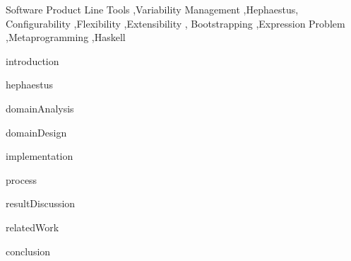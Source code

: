 \documentclass[preprint,12pt]{elsarticle}
\newcommand{\hpl}{\textsf{Hephaestus-PL}}
\newcommand{\hp}{\textsf{Hephaestus}}
\begin{document}
\begin{frontmatter}
\begin{abstract}
  Tool support is essential for application engineering in software
  product lines for the derivation of products from reusable assets.
  Existing tools are more or less specialized in terms of the
  artifacts and the variability mechanisms that they address. There is
  the open problem of providing general configurability, flexibility, and
  extensibility with regard to the artifacts and variability
  mechanisms for such tools.
  This paper addresses the problem by exploring the underlying
  commonality and adequately managing variability of tools for product
  derivation. More specifically, the paper presents domain analysis,
  design, implementation, and a supporting process for enhancing the
  existing \hp{} tool for software product lines into \hpl---a proper
  product line for such tools. Such enhancement is essentially a form
  of bootstrapping.
  An assessment substantiates that \hpl{} actually provides improved
  configurability, flexibility, and extensibility when compared to
  previous versions of \hp.
\end{abstract}

\begin{keyword}
Software Product Line Tools \sep Variability Management \sep \hp \sep
Configurability \sep Flexibility \sep Extensibility \sep
Bootstrapping \sep Expression Problem \sep Metaprogramming \sep Haskell


\end{keyword}

\end{frontmatter}


 {introduction}

 {hephaestus}

 {domainAnalysis}

 {domainDesign}

 {implementation}

 {process}

 {resultDiscussion}

 {relatedWork}

 {conclusion}


\end{document}
